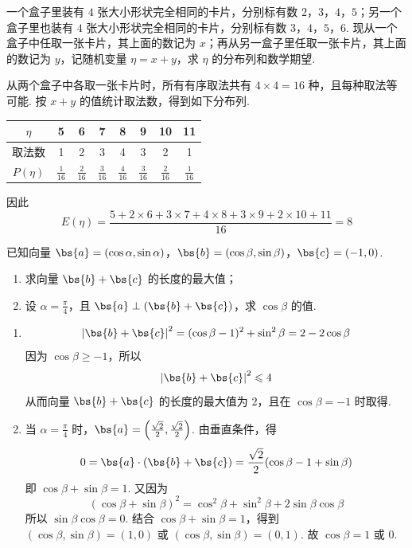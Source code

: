 \begin{problem}
一个盒子里装有 \(4\text{ 张}\)大小形状完全相同的卡片，分别标有数 \(2\)，\(3\)，\(4\)，\(5\)；另一个盒子里也装有 \(4\text{ 张}\)大小形状完全相同的卡片，分别标有数 \(3\)，\(4\)，\(5\)，\(6\). 现从一个盒子中任取一张卡片，其上面的数记为 \(x\)；再从另一盒子里任取一张卡片，其上面的数记为 \(y\)，记随机变量 \(\eta = x + y\)，求 \(\eta\) 的分布列和数学期望.
\end{problem}

\begin{solution}
从两个盒子中各取一张卡片时，所有有序取法共有 \(4\times4=16\) 种，且每种取法等可能. 按 \(x+y\) 的值统计取法数，得到如下分布列.

\begin{center}
\begin{tabular}{c|ccccccc}
\hline
\(\eta\) & 5 & 6 & 7 & 8 & 9 & 10 & 11 \\
\hline
取法数 & 1 & 2 & 3 & 4 & 3 & 2 & 1 \\
\hline
\(P(\eta)\) & \(\frac{1}{16}\) & \(\frac{2}{16}\) & \(\frac{3}{16}\) & \(\frac{4}{16}\) & \(\frac{3}{16}\) & \(\frac{2}{16}\) & \(\frac{1}{16}\) \\
\hline
\end{tabular}
\end{center}

因此
\[
E(\eta)=\frac{5+2\times6+3\times7+4\times8+3\times9+2\times10+11}{16}=8
\]
\end{solution}

\begin{problem}
已知向量 \(\bs{a} = (\cos \alpha, \sin \alpha)\)，\(\bs{b} = (\cos \beta, \sin \beta)\)，\(\bs{c} = (-1, 0)\).

\begin{enumerate}
\item 求向量 \(\bs{b} + \bs{c}\) 的长度的最大值；
\item 设 \(\alpha = \frac{\pi}{4}\)，且 \(\bs{a} \perp (\bs{b} + \bs{c})\)，求 \(\cos \beta\) 的值.
\end{enumerate}
\end{problem}

\begin{solution}
\begin{enumerate}
\item
\[
\left\lvert\bs{b}+\bs{c}\right\rvert^{2}=(\cos\beta-1)^{2}+\sin^{2}\beta=2-2\cos\beta
\]
因为 \(\cos\beta\geqslant-1\)，所以
\[
\left\lvert\bs{b}+\bs{c}\right\rvert^{2}\leqslant4
\]
从而向量 \(\bs{b}+\bs{c}\) 的长度的最大值为 \(2\)，且在 \(\cos\beta=-1\) 时取得.

\item 当 \(\alpha=\frac{\pi}{4}\) 时，\(\bs{a}=\left(\frac{\sqrt{2}}{2},\frac{\sqrt{2}}{2}\right)\). 由垂直条件，得
\[
0=\bs{a}\cdot(\bs{b}+\bs{c})=\frac{\sqrt{2}}{2}(\cos\beta-1+\sin\beta)
\]
即 \(\cos\beta+\sin\beta=1\). 又因为
\[
(\cos\beta+\sin\beta)^{2}=\cos^{2}\beta+\sin^{2}\beta+2\sin\beta\cos\beta
\]
所以 \(\sin\beta\cos\beta=0\). 结合 \(\cos\beta+\sin\beta=1\)，得到 \((\cos\beta,\sin\beta)=(1,0)\) 或 \((\cos\beta,\sin\beta)=(0,1)\).
故 \(\cos\beta=1\) 或 \(0\).
\end{enumerate}
\end{solution}

